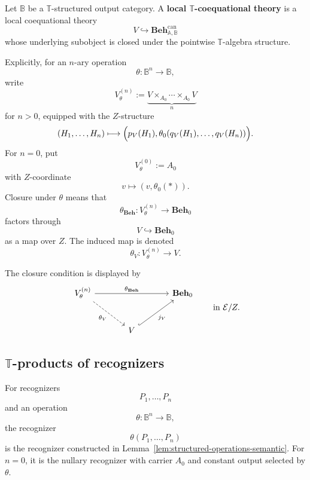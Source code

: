 \begin{definition}
\label{def:T-coequational-theory}
    Let \(\mathbb B\) be a \(\mathbb T\)-structured output category. A
    \textbf{local \(\mathbb T\)-coequational theory} is a local coequational
    theory
    \[
        V\hookrightarrow\mathbf{Beh}^{\mathrm{can}}_{\mathbb A,\mathbb B}
    \]
    whose underlying subobject is closed under the pointwise
    \(\mathbb T\)-algebra structure.

    Explicitly, for an \(n\)-ary operation
    \[
        \theta:\mathbb B^n\to\mathbb B,
    \]
    write
    \[
        V^{(n)}_\theta
        :=
        \underbrace{V\times_{A_0}\cdots\times_{A_0}V}_{n}
    \]
    for \(n>0\), equipped with the \(Z\)-structure
    \[
        (H_1,\dots,H_n)
        \longmapsto
        \Bigl(
            p_V(H_1),
            \theta_0(q_V(H_1),\dots,q_V(H_n))
        \Bigr).
    \]
    For \(n=0\), put
    \[
        V^{(0)}_\theta:=A_0
    \]
    with \(Z\)-coordinate
    \[
        v\longmapsto (v,\theta_0(*)).
    \]
    Closure under \(\theta\) means that
    \[
        \theta_{\mathbf{Beh}}:V^{(n)}_\theta\to\mathbf{Beh}_0
    \]
    factors through
    \[
        V\hookrightarrow\mathbf{Beh}_0
    \]
    as a map over \(Z\). The induced map is denoted
    \[
        \theta_V:V^{(n)}_\theta\to V.
    \]
\end{definition}

The closure condition is displayed by
\[
\begin{tikzcd}[column sep=large, row sep=large]
    V^{(n)}_\theta
        \arrow[rr, "{\theta_{\mathbf{Beh}}}"]
        \arrow[dr, dashed, "\theta_V"']
    &&
    \mathbf{Beh}_0
    \\
    &
    V
        \arrow[ur, hook, "j_V"']
    &
\end{tikzcd}
\qquad
\text{in }\mathcal E/Z.
\]

\subsection{\texorpdfstring{\(\mathbb T\)}{T}-products of recognizers}
\label{subsec:T-products-recognizers}

\begin{definition}
\label{def:T-product-recognizer}
    For recognizers
    \[
        P_1,\dots,P_n
    \]
    and an operation
    \[
        \theta:\mathbb B^n\to\mathbb B,
    \]
    the recognizer
    \[
        \theta(P_1,\dots,P_n)
    \]
    is the recognizer constructed in
    Lemma~\ref{lem:structured-operations-semantic}. For \(n=0\), it is the
    nullary recognizer with carrier \(A_0\) and constant output selected by
    \(\theta\).
\end{definition}

